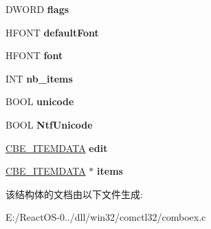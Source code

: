 \begin{DoxyCompactItemize}
D\+W\+O\+RD {\bfseries flags}
\item 
\mbox{\label{struct_c_o_m_b_o_e_x___i_n_f_o_a3ae7cd3117ee4dc69386d913b7da8d9e}} 
H\+F\+O\+NT {\bfseries default\+Font}
\item 
\mbox{\label{struct_c_o_m_b_o_e_x___i_n_f_o_a22a31cf423ff3de1386ad44dc662067b}} 
H\+F\+O\+NT {\bfseries font}
\item 
\mbox{\label{struct_c_o_m_b_o_e_x___i_n_f_o_ab3ca76e03c111d393cd1586d0f6ec5a8}} 
I\+NT {\bfseries nb\+\_\+items}
\item 
\mbox{\label{struct_c_o_m_b_o_e_x___i_n_f_o_a11f8bfec0b4de779ea15e8685dd4d5db}} 
B\+O\+OL {\bfseries unicode}
\item 
\mbox{\label{struct_c_o_m_b_o_e_x___i_n_f_o_a0069f76456b5c988024f486a150832cc}} 
B\+O\+OL {\bfseries Ntf\+Unicode}
\item 
\mbox{\label{struct_c_o_m_b_o_e_x___i_n_f_o_ad2112d9e6c6943c6870f7c53d3d411e5}} 
\hyperlink{struct___c_b_e___i_t_e_m_d_a_t_a}{C\+B\+E\+\_\+\+I\+T\+E\+M\+D\+A\+TA} {\bfseries edit}
\item 
\mbox{\label{struct_c_o_m_b_o_e_x___i_n_f_o_ae4db7d7f3643747e1e8ace99e709a20d}} 
\hyperlink{struct___c_b_e___i_t_e_m_d_a_t_a}{C\+B\+E\+\_\+\+I\+T\+E\+M\+D\+A\+TA} $\ast$ {\bfseries items}
\end{DoxyCompactItemize}


该结构体的文档由以下文件生成\+:\begin{DoxyCompactItemize}
\item 
E\+:/\+React\+O\+S-\/0../dll/win32/comctl32/comboex.\+c\end{DoxyCompactItemize}
